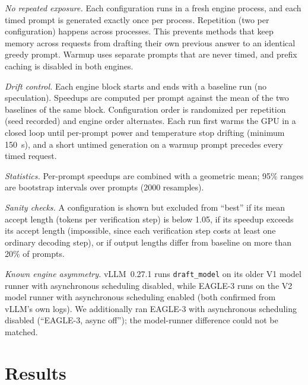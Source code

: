 \documentclass[conference]{IEEEtran}
\begin{document}
\emph{No repeated exposure.} Each configuration runs in a fresh engine
process, and each timed prompt is generated exactly once per process.
Repetition (two per configuration) happens across processes. This prevents
methods that keep memory across requests from drafting their own previous
answer to an identical greedy prompt. Warmup uses separate prompts that are
never timed, and prefix caching is disabled in both engines.

\emph{Drift control.} Each engine block starts and ends with a baseline run
(no speculation). Speedups are computed per prompt against the mean of the
two baselines of the same block. Configuration order is randomized per
repetition (seed recorded) and engine order alternates. Each run first
warms the GPU in a closed loop until per-prompt power and temperature stop
drifting (minimum 150~s), and a short untimed generation on a warmup prompt
precedes every timed request.

\emph{Statistics.} Per-prompt speedups are combined with a geometric mean;
95\% ranges are bootstrap intervals over prompts (2000 resamples).

\emph{Sanity checks.} A configuration is shown but excluded from ``best''
if its mean accept length (tokens per verification step) is below 1.05, if
its speedup exceeds its accept length (impossible, since each verification
step costs at least one ordinary decoding step), or if output lengths
differ from baseline on more than 20\% of prompts.

\emph{Known engine asymmetry.} vLLM~0.27.1 runs \texttt{draft\_model} on its
older V1 model runner with asynchronous scheduling disabled, while EAGLE-3
runs on the V2 model runner with asynchronous scheduling enabled (both
confirmed from vLLM's own logs). We additionally ran EAGLE-3 with
asynchronous scheduling disabled (``EAGLE-3, async off''); the model-runner
difference could not be matched.

\section{Results}
\label{sec:results}
\end{document}
